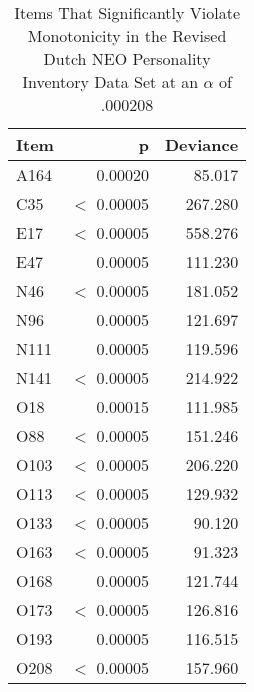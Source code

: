 \begin{table}[ht]
\centering
\caption{Items That Significantly Violate Monotonicity in the Revised Dutch NEO Personality Inventory Data Set at an $\alpha$ of .000208} 
\label{tab:neo_pi_r_dolan2}
\begin{tabular}{lrr}
  \toprule
Item & p & Deviance \\ 
  \midrule
A164 & 0.00020 & 85.017 \\ 
  C35 & $<$ 0.00005 & 267.280 \\ 
  E17 & $<$ 0.00005 & 558.276 \\ 
  E47 & 0.00005 & 111.230 \\ 
  N46 & $<$ 0.00005 & 181.052 \\ 
  N96 & 0.00005 & 121.697 \\ 
  N111 & 0.00005 & 119.596 \\ 
  N141 & $<$ 0.00005 & 214.922 \\ 
  O18 & 0.00015 & 111.985 \\ 
  O88 & $<$ 0.00005 & 151.246 \\ 
  O103 & $<$ 0.00005 & 206.220 \\ 
  O113 & $<$ 0.00005 & 129.932 \\ 
  O133 & $<$ 0.00005 & 90.120 \\ 
  O163 & $<$ 0.00005 & 91.323 \\ 
  O168 & 0.00005 & 121.744 \\ 
  O173 & $<$ 0.00005 & 126.816 \\ 
  O193 & 0.00005 & 116.515 \\ 
  O208 & $<$ 0.00005 & 157.960 \\ 
   \bottomrule
\end{tabular}
\end{table}
